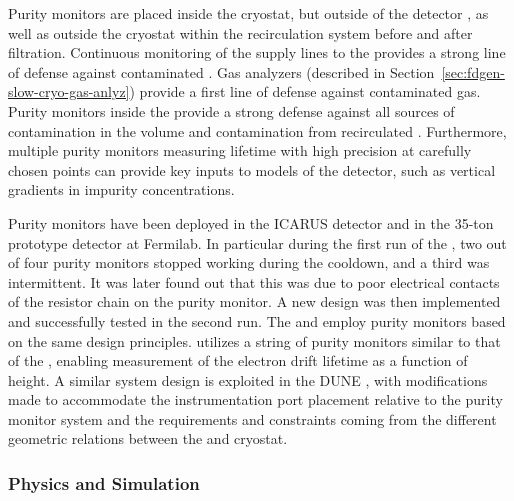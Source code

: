 Purity monitors are placed inside the cryostat, but outside of the detector , as well as outside the cryostat within the recirculation system before and after filtration. %
Continuous monitoring of  the  supply lines to the  provides a strong line of defense against contaminated \lar. Gas analyzers (described in Section~\ref{sec:fdgen-slow-cryo-gas-anlyz}) provide a first line of defense against contaminated gas.  Purity monitors inside the  provide a strong defense against all sources of contamination in the \lar volume and contamination from recirculated \lar. 
Furthermore, multiple purity monitors measuring lifetime with high precision at carefully chosen points can provide key inputs to  models of the detector, such as vertical gradients in impurity concentrations.

Purity monitors have been deployed in the ICARUS detector and in the 35-ton prototype detector at Fermilab. In particular during the first run of the , two out of four purity monitors stopped working during the cooldown, and a third was intermittent. It was later found out that this was due to poor electrical contacts of the resistor chain on the purity monitor. A new design was then implemented and successfully tested in the second run. 
The  and  employ purity monitors based on the same design principles.  utilizes a string of purity monitors similar to that of the , enabling measurement of the electron drift lifetime as a function of height.  A similar system design is exploited in the DUNE , with modifications made to accommodate the instrumentation port placement relative to the purity monitor system and the requirements and constraints coming from the different geometric relations between the  and cryostat. 

\subsubsection{Physics and Simulation}

